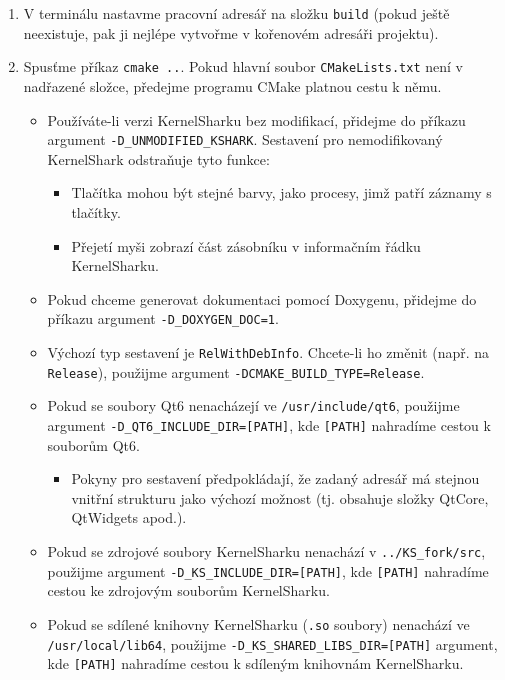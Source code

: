 \begin{enumerate}
  \item V terminálu nastavme pracovní adresář na složku \texttt{build} (pokud ještě neexistuje, pak ji nejlépe vytvořme v kořenovém adresáři projektu).
  \item Spusťme příkaz \texttt{cmake ..}. Pokud hlavní soubor \texttt{CMakeLists.txt} není v nadřazené složce, předejme programu CMake platnou cestu k němu.
    \begin{itemize}
      \item Používáte-li verzi KernelSharku bez modifikací, přidejme do příkazu argument \texttt{-D\_UNMODIFIED\_KSHARK}.
      Sestavení pro nemodifikovaný KernelShark odstraňuje tyto funkce:
      \begin{itemize}
        \item Tlačítka mohou být stejné barvy, jako procesy, jimž patří záznamy s tlačítky.
        \item Přejetí myši zobrazí část zásobníku v informačním řádku KernelSharku.
      \end{itemize}
      \item Pokud chceme generovat dokumentaci pomocí Doxygenu, přidejme do příkazu argument \texttt{-D\_DOXYGEN\_DOC=1}.
      \item Výchozí typ sestavení je \texttt{RelWithDebInfo}. Chcete-li ho změnit (např. na \texttt{Release}), použijme argument \texttt{-DCMAKE\_BUILD\_TYPE=Release}.
      \item Pokud se soubory Qt6 nenacházejí ve \texttt{/usr/include/qt6}, použijme argument \texttt{-D\_QT6\_INCLUDE\_DIR=[PATH]}, kde \texttt{[PATH]} nahradíme cestou k souborům Qt6.
        \begin{itemize}
          \item Pokyny pro sestavení předpokládají, že zadaný adresář má stejnou vnitřní strukturu jako výchozí možnost (tj. obsahuje složky QtCore, QtWidgets apod.).
        \end{itemize}
      \item Pokud se zdrojové soubory KernelSharku nenachází v \texttt{../KS\_fork/src}, použijme argument \texttt{-D\_KS\_INCLUDE\_DIR=[PATH]}, kde \texttt{[PATH]} nahradíme cestou ke zdrojovým souborům KernelSharku.
      \item Pokud se sdílené knihovny KernelSharku (\texttt{.so} soubory) nenachází ve \texttt{/usr/local/lib64}, použijme \texttt{-D\_KS\_SHARED\_LIBS\_DIR=[PATH]} argument, kde \texttt{[PATH]} nahradíme cestou k sdíleným knihovnám KernelSharku.
    \end{itemize}

\end{enumerate}
